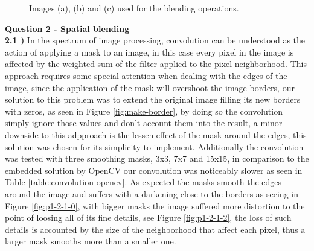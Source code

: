 \documentclass[12pt,a4paper]{article}
\begin{document}
\begin{figure}[!h]
{{		}
	}
	\caption{Images (a), (b) and (c) used for the blending operations.}
	\label{fig:blending}
\end{figure}
	
\textbf{\LARGE Question 2 - Spatial blending}\\

\textbf{2.1 )} In the spectrum of image processing, convolution can be understood as the action of applying a mask to an image, in this case every pixel in the image is affected by the weighted sum of the filter applied to the pixel neighborhood. This approach requires some special attention when dealing with the edges of the image, since the application of the mask will overshoot the image borders, our solution to this problem was to extend the original image filling its new borders with zeros, as seen in Figure \ref{fig:make-border}, by doing so the convolution simply ignore those values and don't account them into the result, a minor downside to this adpproach is the lessen effect of the mask around the edges, this solution was chosen for its simplicity to implement. Additionally the convolution was tested with three smoothing masks, 3x3, 7x7 and 15x15, in comparison to the embedded solution by OpenCV our convolution was noticeably slower as seen in Table \ref{table:convolution-opencv}. As expected the masks smooth the edges around the image and suffers with a darkening close to the borders as seeing in Figure \ref{fig:p1-2-1-0}, with bigger masks the image suffered more distortion to the point of loosing all of its fine details, see Figure \ref{fig:p1-2-1-2}, the loss of such details is accounted by the size of the neighborhood that affect each pixel, thus a larger mask smooths more than a smaller one.\\
\end{document}
